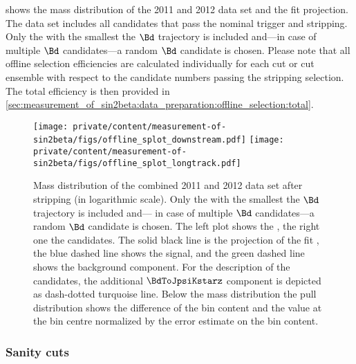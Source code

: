 shows the mass distribution of the 2011 and 2012 data set and the fit
projection. The data set includes  all candidates that pass the nominal trigger
and stripping. Only the \PV with the smallest \IP \chisqndf \wrt the $\Bd$
trajectory is included and---in case of multiple $\Bd$ candidates---a random
$\Bd$ candidate is chosen. Please note that all offline selection efficiencies
are calculated individually for each cut or cut ensemble with respect to the
candidate numbers passing the stripping selection. The total efficiency is then
provided in
\cref{sec:measurement_of_sin2beta:data_preparation:offline_selection:total}.
%
\begin{figure}
\texttt{[image: private/content/measurement-of-sin2beta/figs/offline\_splot\_downstream.pdf]}
\texttt{[image: private/content/measurement-of-sin2beta/figs/offline\_splot\_longtrack.pdf]}
  \caption{Mass distribution of the combined 2011 and 2012 data set after
  stripping (in logarithmic scale). Only the \PV with the smallest \IP \chisqndf
  \wrt the $\Bd$ trajectory is included and--- in case of multiple $\Bd$
  candidates---a random $\Bd$ candidate is chosen. The left plot shows the
  \catDD, the right one the \catLL candidates. The solid black line is the
  projection of the fit \PDF, the blue dashed line shows the signal, and the
  green dashed line shows the background component. For the description of the
  \catLL candidates, the additional $\BdToJpsiKstarz$ component is depicted as
  dash-dotted turquoise line. Below the mass distribution the pull distribution
  shows the difference of the bin content and the \PDF value at the bin centre
  normalized by the error estimate on the bin content.}
  \label{fig:measurement_of_sin2beta:data_preparation:offline_selection:before}
\end{figure}

\subsubsection{Sanity cuts}
\label{sec:measurement_of_sin2beta:data_preparation:offline_selection:sanity}

